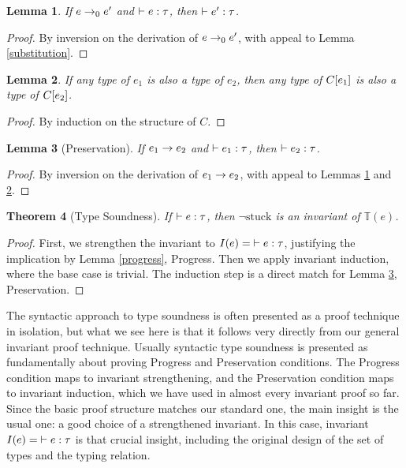 \documentclass{amsbook}
\newtheorem{theorem}{Theorem}[chapter]
\newtheorem{lemma}[theorem]{Lemma}
\theoremstyle{definition}
\theoremstyle{remark}
\numberwithin{section}{chapter}
\numberwithin{equation}{chapter}
\begin{document}
\begin{lemma}\label{preservation0}
  If $e \to_0 e'$ and $\vdash e : \tau$, then $\vdash e' : \tau$.
\end{lemma}
\begin{proof}
  By inversion on the derivation of $e \to_0 e'$, with appeal to Lemma \ref{substitution}.
\end{proof}

\begin{lemma}\label{generalize_plug}
  If any type of $e_1$ is also a type of $e_2$, then any type of $C[e_1]$ is also a type of $C[e_2]$.
\end{lemma}
\begin{proof}
  By induction on the structure of $C$.
\end{proof}

\begin{lemma}[Preservation]\label{preservation}
  If $e_1 \to e_2$ and $\vdash e_1 : \tau$, then $\vdash e_2 : \tau$.
\end{lemma}
\begin{proof}
  By inversion on the derivation of $e_1 \to e_2$, with appeal to Lemmas \ref{preservation0} and \ref{generalize_plug}.
\end{proof}

\invariants
\begin{theorem}[Type Soundness]
  If $\vdash e : \tau$, then $\neg \textrm{stuck}$ is an invariant of $\mathbb T(e)$.
\end{theorem}
\begin{proof}
  First, we strengthen the invariant to $I(e) = \; \vdash e : \tau$, justifying the implication by Lemma \ref{progress}, Progress.
  Then we apply invariant induction, where the base case is trivial.
  The induction step is a direct match for Lemma \ref{preservation}, Preservation.
\end{proof}

The syntactic approach to type soundness is often presented as a proof technique in isolation, but what we see here is that it follows very directly from our general invariant proof technique.
Usually syntactic type soundness is presented as fundamentally about proving Progress and Preservation conditions.
The Progress condition maps to invariant strengthening, and the Preservation condition maps to invariant induction, which we have used in almost every invariant proof so far.
Since the basic proof structure matches our standard one, the main insight is the usual one: a good choice of a strengthened invariant.
In this case, invariant $I(e) = \; \vdash e : \tau$ is that crucial insight, including the original design of the set of types and the typing relation.
\end{document}
